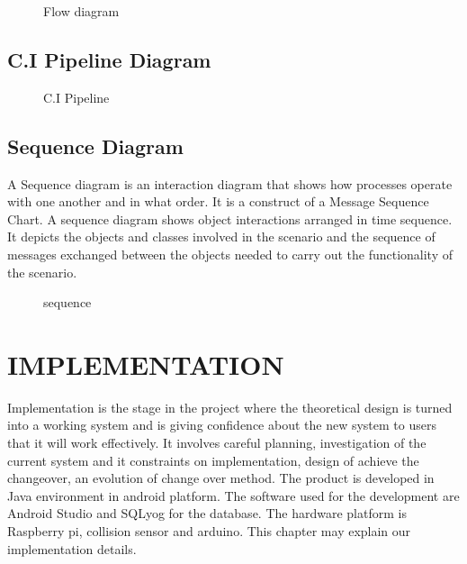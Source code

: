 \documentclass[12pt,a4paper,oneside]{report}
\begin{document}
{\begin{figure}[h]
\begin{center}
\hspace{.0 in}
\caption{Flow diagram}
\end{center}

\end{figure}
\pagebreak
\section{C.I Pipeline Diagram}
\begin{figure}[h]
\begin{center}

\hspace{.0 in}
\caption{C.I Pipeline}
\end{center}

\end{figure}
\pagebreak
\section{Sequence Diagram}
\par A Sequence diagram is an interaction diagram that shows how processes operate with
one another and in what order. It is a construct of a Message Sequence Chart. A sequence
diagram shows object interactions arranged in time sequence. It depicts the objects and classes
involved in the scenario and the sequence of messages exchanged between the objects needed
to carry out the functionality of the scenario.
\begin{figure}[h]
\begin{center}

\hspace{.0 in}
\caption{sequence}
\end{center}

\end{figure}


\chapter{IMPLEMENTATION}
Implementation is the stage in the project where the theoretical design is turned into a working system and is giving confidence about the new system to users that it will work effectively. It involves careful planning, investigation of the current system and it constraints on implementation, design of achieve the changeover, an evolution of change over method. The product is developed in Java environment in android platform. The software used for the development are Android Studio and SQLyog for the database. The hardware platform is Raspberry pi, collision sensor and arduino. This chapter may explain our implementation details.

}
\end{document}
